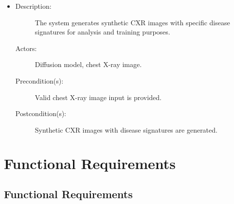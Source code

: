 \documentclass[12pt]{article}
\begin{document}
\begin{itemize}
    \item 
    \begin{description}
        \item[Description:] The system generates synthetic CXR images with specific disease signatures for analysis and training purposes.
        \item[Actors:] Diffusion model, chest X-ray image.
        \item[Precondition(s):] Valid chest X-ray image input is provided.
        \item[Postcondition(s):] Synthetic CXR images with disease signatures are generated.
    \end{description}
\end{itemize}





\section{Functional Requirements}
\subsection{Functional Requirements}
\end{document}
